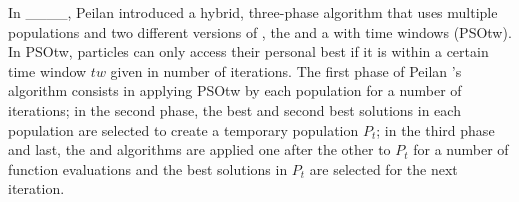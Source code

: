 In ____, Peilan \etal introduced a hybrid, three-phase algorithm that uses multiple populations and two different versions of \PSO, the \stanPSO and a \PSO with time windows (PSOtw).
In PSOtw, particles can only access their personal best if it is within a certain time window $tw$ given in number of iterations.
The first phase of Peilan \etal's algorithm consists in applying PSOtw by each population for a number of iterations; in the second phase, the best and second best solutions in each population are selected to create a temporary population $P_t$; in the third phase and last, the \stanPSO and \CMAES algorithms are applied one after the other to $P_t$ for a number of function evaluations and the best solutions in $P_t$ are selected for the next iteration.
%


